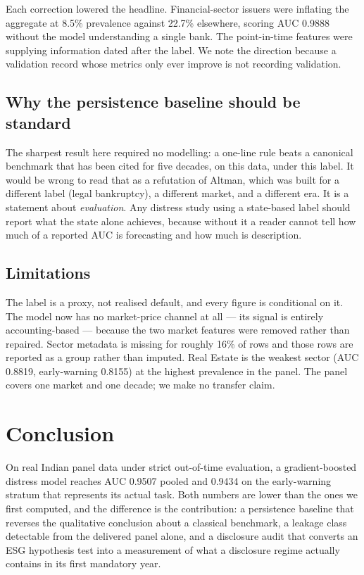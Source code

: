 \documentclass[conference]{IEEEtran}
\begin{document}
Each correction lowered the headline. Financial-sector issuers were inflating
the aggregate at 8.5\% prevalence against 22.7\% elsewhere, scoring AUC 0.9888
without the model understanding a single bank. The point-in-time features were
supplying information dated after the label. We note the direction because a
validation record whose metrics only ever improve is not recording validation.

\subsection{Why the persistence baseline should be standard}
The sharpest result here required no modelling: a one-line rule beats a
canonical benchmark that has been cited for five decades, on this data, under
this label. It would be wrong to read that as a refutation of Altman, which
was built for a different label (legal bankruptcy), a different market, and a
different era. It is a statement about \emph{evaluation}. Any distress study
using a state-based label should report what the state alone achieves, because
without it a reader cannot tell how much of a reported AUC is forecasting and
how much is description.

\subsection{Limitations}
The label is a proxy, not realised default, and every figure is conditional on
it. The model now has no market-price channel at all --- its signal is entirely
accounting-based --- because the two market features were removed rather than
repaired. Sector metadata is missing for roughly 16\% of rows and those rows are
reported as a group rather than imputed. Real Estate is the weakest sector
(AUC 0.8819, early-warning 0.8155) at the highest prevalence in the panel. The
panel covers one market and one decade; we make no transfer claim.

\section{Conclusion}

On real Indian panel data under strict out-of-time evaluation, a gradient-boosted
distress model reaches AUC 0.9507 pooled and 0.9434 on the early-warning
stratum that represents its actual task. Both numbers are lower than the ones
we first computed, and the difference is the contribution: a persistence
baseline that reverses the qualitative conclusion about a classical benchmark,
a leakage class detectable from the delivered panel alone, and a disclosure
audit that converts an ESG hypothesis test into a measurement of what a
disclosure regime actually contains in its first mandatory year.
\end{document}
